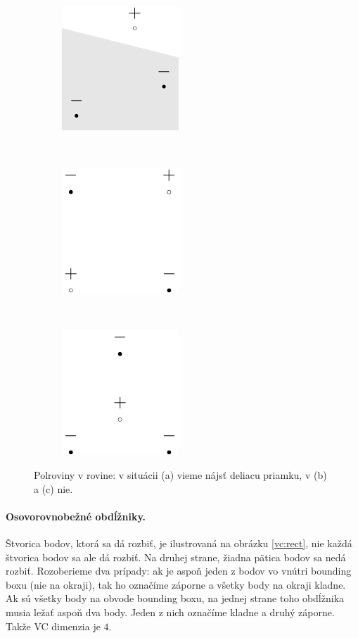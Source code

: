 \begin{figure}
  \centering
  \begin{subfigure}[b]{0.3\linewidth}
    \centering
    \includegraphics[scale=1]{obrazky/halfplane1.pdf}
    \caption{}
  \end{subfigure}
  ~
  \begin{subfigure}[b]{0.3\linewidth}
    \centering
    \includegraphics[scale=1]{obrazky/halfplane2.pdf}
    \caption{}
  \end{subfigure}
  ~
  \begin{subfigure}[b]{0.3\linewidth}
    \centering
    \includegraphics[scale=1]{obrazky/halfplane3.pdf}
    \caption{}
  \end{subfigure}
  \caption{Polroviny v rovine: v situácii (a) vieme nájsť deliacu priamku, v (b) a (c) nie.}
  \label{vc:halfplane}
\end{figure}

\paragraph{Osovorovnobežné obdĺžniky.} Štvorica bodov, ktorá sa dá
rozbiť, je ilustrovaná na obrázku \ref{vc:rect}, nie každá štvorica
bodov sa ale dá rozbiť. Na druhej strane, žiadna pätica bodov sa nedá
rozbiť. Rozoberieme dva prípady: ak je aspoň jeden z bodov vo vnútri 
bounding boxu (nie na okraji), tak ho označíme záporne a všetky body na 
okraji kladne. Ak sú všetky body na obvode bounding boxu, na jednej 
strane toho obdĺžnika musia ležať aspoň dva body. Jeden z nich označíme 
kladne a druhý záporne. Takže VC dimenzia je $4$.

